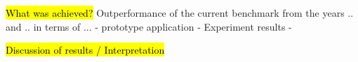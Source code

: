 \documentclass[11pt,a4paper]{scrbook}
\begin{document}

\hl{What was achieved?}\newline
Outperformance of the current benchmark from the years .. and .. in terms of ...
- prototype application
- Experiment results - 

\hl{Discussion of results / Interpretation}
\end{document}
